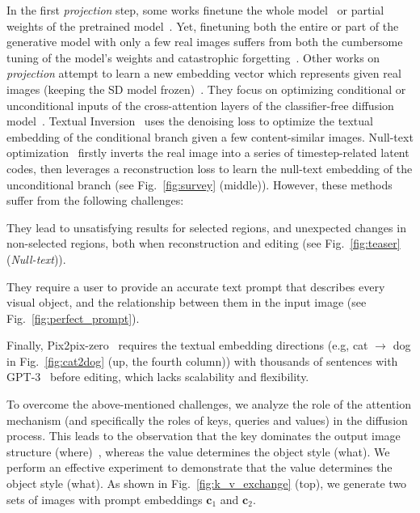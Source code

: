 \documentclass[twocolumn]{svjour3}          \smartqed  \usepackage{graphicx}
\begin{document}
In the first \emph{projection} step, some works finetune the whole model~\citep{Kawar2022ImagicTR, valevski2022unitune, ruiz2022dreambooth,kim2022diffusionclip,gal2023encoder,xiao2023fastcomposer} or  partial weights of the pretrained model~\citep{kumari2022multi,xie2023difffit}.  Yet,  finetuning both the entire or part of the generative model with only a few real images suffers from both the cumbersome tuning of the model's weights and catastrophic forgetting~\citep{kumari2022multi,wu2018memory,xie2023difffit}.  
Other works on \emph{projection} attempt to  learn a new embedding vector which represents given real images (keeping the SD model frozen)~\citep{ho2021classifier,gal2022image,avrahami2023break,han2023highly,tewel2023key,zhang2023prospect,dong2023prompt}. They focus on optimizing conditional or unconditional inputs of the cross-attention layers of the classifier-free diffusion model~\citep{ho2021classifier}. 
Textual Inversion~\citep{gal2022image} uses the denoising loss  to optimize the  textual embedding of the conditional branch given a few content-similar images. 
Null-text optimization~\citep{mokady2022null} firstly inverts the real image into a series of timestep-related latent codes, then leverages a reconstruction loss to learn the null-text embedding of the unconditional branch (see Fig.~\ref{fig:survey} (middle)). However, these methods suffer from the following challenges:
 \begin{enumerate*}[label=(\Roman*)]
    \item They lead to unsatisfying results for selected regions, and unexpected changes in non-selected regions, both when reconstruction and editing (see Fig.~\ref{fig:teaser} (\textit{Null-text})).
     \item They require a user to provide an accurate text prompt that describes every visual object,  and the relationship between them in the input image (see Fig.~\ref{fig:perfect_prompt}). 
 \end{enumerate*}
Finally, Pix2pix-zero~\citep{parmar2023zero} requires the textual embedding directions (e.g, cat $\rightarrow$ dog in Fig.~\ref{fig:cat2dog} (up, the fourth column)) with thousands of sentences with GPT-3~\citep{brown2020language} before editing, which lacks scalability and flexibility.

To overcome the above-mentioned challenges, we analyze the role of the attention mechanism (and specifically the roles of keys, queries and values) in the diffusion process. This leads to the observation that the key dominates the output image structure (where)~\citep{hertz2022prompt},  whereas the value determines the object style (what).  
We perform an effective experiment to demonstrate that the value determines the object style (what). As shown in Fig.~\ref{fig:k_v_exchange} (top),  we generate two sets of images with prompt embeddings $\mathbf{c}_1$ and $\mathbf{c}_2$.
\end{document}
